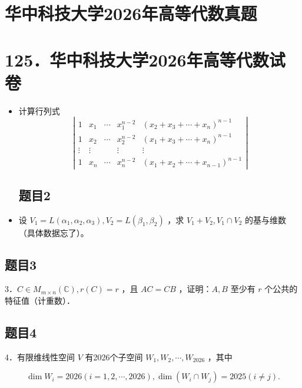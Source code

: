 \documentclass{article}
\begin{document}
\section*{华中科技大学2026年高等代数真题}
\section*{125．华中科技大学2026年高等代数试卷}
\begin{itemize}

\subsection{题目1}
  \item[1．] 计算行列式
\[
\left|\begin{array}{ccccc}
1 & x_{1} & \cdots & x_{1}^{n-2} & \left(x_{2}+x_{3}+\cdots+x_{n}\right)^{n-1} \\
1 & x_{2} & \cdots & x_{2}^{n-2} & \left(x_{1}+x_{3}+\cdots+x_{n}\right)^{n-1} \\
\vdots & \vdots & & \vdots & \vdots \\
1 & x_{n} & \cdots & x_{n}^{n-2} & \left(x_{1}+x_{2}+\cdots+x_{n-1}\right)^{n-1}
\end{array}\right|
\]

\subsection{题目2}
  \item[2．] 设 \(V_{1}=L\left(\alpha_{1}, \alpha_{2}, \alpha_{3}\right), V_{2}=L\left(\beta_{1}, \beta_{2}\right)\) ，求 \(V_{1}+V_{2}, V_{1} \cap V_{2}\) 的基与维数（具体数据忘了）。
\end{itemize}

\subsection{题目3}
3．\(C \in M_{m \times n}(\mathbb{C}), r(C)=r\) ，且 \(A C=C B\) ，证明：\(A, B\) 至少有 \(r\) 个公共的特征值（计重数）．

\subsection{题目4}
4．有限维线性空间 \(V\) 有2026个子空间 \(W_{1}, W_{2}, \cdots, W_{2026}\) ，其中

\[
\operatorname{dim} W_{i}=2026(i=1,2, \cdots, 2026), \operatorname{dim}\left(W_{i} \cap W_{j}\right)=2025(i \neq j) .
\]
\end{document}
